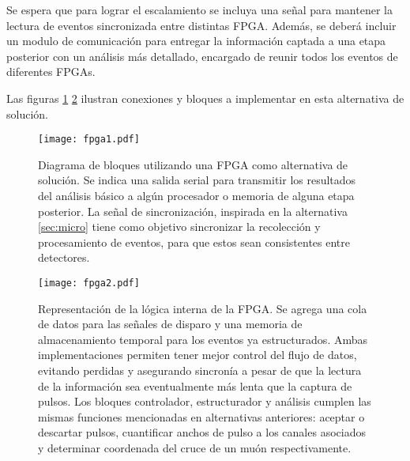 	\par Se espera que para lograr el escalamiento se incluya una señal para mantener la lectura de eventos sincronizada entre distintas FPGA. Además, se deberá incluir un modulo de comunicación para entregar la información captada a una etapa posterior con un análisis más detallado, encargado de reunir todos los eventos de diferentes FPGAs.
	
	\newpage
	\par Las figuras \ref{img:fpga1} \ref{img:fpga2} ilustran conexiones y bloques a implementar en esta alternativa de solución.
	
	\begin{figure}[H]
		\centering
		\texttt{[image: fpga1.pdf]}
		\caption{Diagrama de bloques utilizando una FPGA como alternativa de solución. Se indica una salida serial para transmitir los resultados del análisis básico a algún procesador o memoria de alguna etapa posterior. La señal de sincronización, inspirada en la alternativa \ref{sec:micro} tiene como objetivo sincronizar la recolección y procesamiento de eventos, para que estos sean consistentes entre detectores.}
		\label{img:fpga1}
	\end{figure}
	
	\begin{figure}[H]
		\centering
		\texttt{[image: fpga2.pdf]}
		\caption{Representación de la lógica interna de la FPGA. Se agrega una cola de datos para las señales de disparo y una memoria de almacenamiento temporal para los eventos ya estructurados. Ambas implementaciones permiten tener mejor control del flujo de datos, evitando perdidas y asegurando sincronía a pesar de que la lectura de la información sea eventualmente más lenta que la captura de pulsos. Los bloques controlador, estructurador y análisis cumplen las mismas funciones mencionadas en alternativas anteriores: aceptar o descartar pulsos, cuantificar anchos de pulso a  los canales asociados y determinar coordenada del cruce de un muón respectivamente.}
		\label{img:fpga2}
	\end{figure}
	
	\newpage
